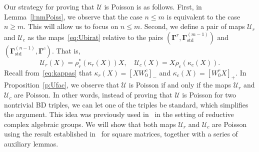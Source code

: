 \documentclass[11pt]{article}
\newcommand{\bg}{\mathbf{\Gamma}}
\newcommand{\std}{\mathrm{std}}
\theoremstyle{definition}\newtheorem{definition}[theorem]{Definition}
\theoremstyle{definition}\newtheorem{remark}[theorem]{Remark}
\theoremstyle{remark}
\numberwithin{equation}{section}
\begin{document}
Our strategy for proving that $\mathcal{U}$ is Poisson is as follows. First, in Lemma~\ref{l:nmPoiss}, we observe that the case $n \leq m$ is equivalent to the case $n \geq m$. This will allow us to focus on $n \leq m$. Second, we define a pair of maps $\mathcal{U}_r$ and $\mathcal{U}_c$ as the maps~\eqref{eq:Ubirat} relative to the pairs $(\bg^r,\bg_{\std}^{(m-1)})$ and $(\bg_{\std}^{(n-1)},\bg^c)$. That is,
\begin{equation*}
    \mathcal{U}_r(X) = \rho_r^*(\kappa_r(X))X, \quad \mathcal{U}_c(X) = X \rho_c(\kappa_c(X)).
\end{equation*}
Recall from~\eqref{eq:kappas} that $\kappa_r(X) = [XW_0^c]_-$ and $\kappa_c(X) = [W_0^r X]_+$. In Proposition~\ref{p:Ufac}, we observe that $\mathcal{U}$ is Poisson if and only if the maps $\mathcal{U}_r$ and $\mathcal{U}_c$ are Poisson. In other words, instead of proving that $\mathcal{U}$ is Poisson for two nontrivial BD triples, we can let one of the triples be standard, which simplifies the argument. This idea was previously used in~\cite{gsv-unified} in the setting of reductive complex algebraic groups. We will show that both maps $\mathcal{U}_r$ and $\mathcal{U}_c$ are Poisson using the result established in~\cite{gsv-unified} for square matrices, together with a series of auxiliary lemmas.
\end{document}
